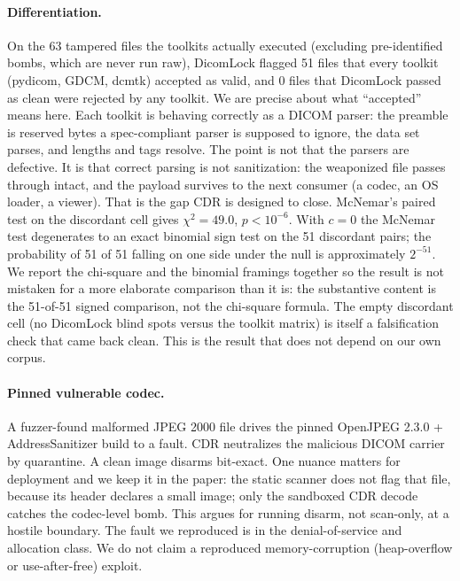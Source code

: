 \documentclass[11pt]{article}
\begin{document}
\paragraph{Differentiation.} On the 63 tampered files the toolkits actually executed (excluding pre-identified bombs, which are never run raw), DicomLock flagged 51 files that every toolkit (pydicom, GDCM, dcmtk) accepted as valid, and 0 files that DicomLock passed as clean were rejected by any toolkit. We are precise about what ``accepted'' means here. Each toolkit is behaving correctly as a DICOM parser: the preamble is reserved bytes a spec-compliant parser is supposed to ignore, the data set parses, and lengths and tags resolve. The point is not that the parsers are defective. It is that correct parsing is not sanitization: the weaponized file passes through intact, and the payload survives to the next consumer (a codec, an OS loader, a viewer). That is the gap CDR is designed to close. McNemar's paired test on the discordant cell gives $\chi^2 = 49.0$, $p < 10^{-6}$. With $c = 0$ the McNemar test degenerates to an exact binomial sign test on the 51 discordant pairs; the probability of 51 of 51 falling on one side under the null is approximately $2^{-51}$. We report the chi-square and the binomial framings together so the result is not mistaken for a more elaborate comparison than it is: the substantive content is the 51-of-51 signed comparison, not the chi-square formula. The empty discordant cell (no DicomLock blind spots versus the toolkit matrix) is itself a falsification check that came back clean. This is the result that does not depend on our own corpus.

\paragraph{Pinned vulnerable codec.} A fuzzer-found malformed JPEG 2000 file drives the pinned OpenJPEG 2.3.0 + AddressSanitizer build to a fault. CDR neutralizes the malicious DICOM carrier by quarantine. A clean image disarms bit-exact. One nuance matters for deployment and we keep it in the paper: the static scanner does not flag that file, because its header declares a small image; only the sandboxed CDR decode catches the codec-level bomb. This argues for running disarm, not scan-only, at a hostile boundary. The fault we reproduced is in the denial-of-service and allocation class. We do not claim a reproduced memory-corruption (heap-overflow or use-after-free) exploit.
\end{document}

